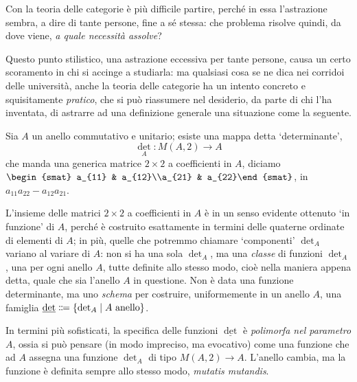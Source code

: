 Con la teoria delle categorie è più difficile partire, perché in essa l'astrazione sembra, a dire di tante persone, fine a sé stessa: che problema risolve quindi, da dove viene, \emph{a quale necessità assolve}?

Questo punto stilistico, una astrazione eccessiva per tante persone, causa un certo scoramento in chi si accinge a studiarla: ma qualsiasi cosa se ne dica nei corridoi delle università, anche la teoria delle categorie ha un intento concreto e squisitamente \emph{pratico}, che si può riassumere nel desiderio, da parte di chi l'ha inventata, di astrarre ad una definizione generale una situazione come la seguente.
\begin{example}
 Sia \(A\) un anello commutativo e unitario; esiste una mappa detta `determinante',
 \[\textstyle\det_A : M(A,2) \to A\]
 che manda una generica matrice \(2\times 2\) a coefficienti in \(A\), diciamo \(\begin{smat} a_{11} & a_{12}\\a_{21} & a_{22}\end{smat}\), in \(a_{11}a_{22}-a_{12}a_{21}\).
\end{example}
L'insieme delle matrici \(2\times 2\) a coefficienti in \(A\) è in un senso evidente ottenuto `in funzione' di \(A\), perché è costruito esattamente in termini delle quaterne ordinate di elementi di \(A\); in più, quelle che potremmo chiamare `componenti' \(\det_A\) variano al variare di \(A\): non si ha una sola \(\det_A\), ma una \emph{classe} di funzioni \(\det_A\), una per ogni anello \(A\), tutte definite allo stesso modo, cioè nella maniera appena detta, quale che sia l'anello \(A\) in questione. Non è data una funzione determinante, ma uno \emph{schema} per costruire, uniformemente in un anello \(A\), una	famiglia \(\underline{\det}\defeq \{\det_A \mid A \text{ anello}\}\).

In termini più sofisticati, la specifica delle funzioni \(\underline{\det}\) è \emph{polimorfa nel parametro} \(A\), ossia si può pensare (in modo impreciso, ma evocativo) come una funzione che ad \(A\) assegna una funzione \(\det_A\) di tipo \(M(A,2) \to A\). L'anello cambia, ma la funzione è definita sempre allo stesso modo, \emph{mutatis mutandis}.

